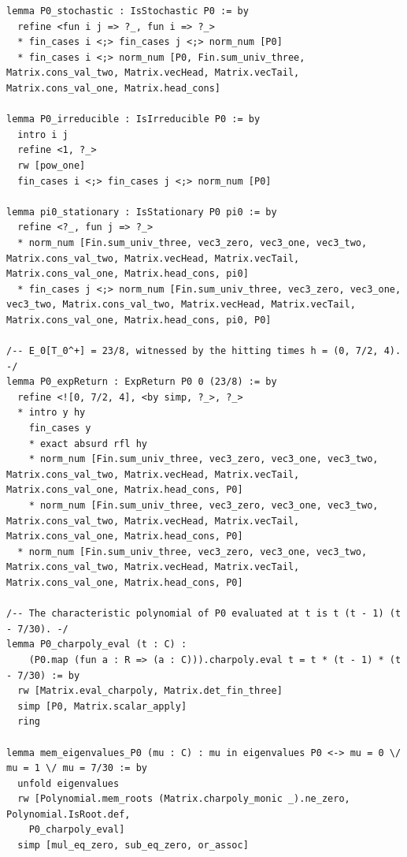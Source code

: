 \documentclass[11pt,a4paper]{article}
\begin{document}
\begin{lstlisting}[language={}]
lemma P0_stochastic : IsStochastic P0 := by
  refine <fun i j => ?_, fun i => ?_>
  * fin_cases i <;> fin_cases j <;> norm_num [P0]
  * fin_cases i <;> norm_num [P0, Fin.sum_univ_three, Matrix.cons_val_two, Matrix.vecHead, Matrix.vecTail, Matrix.cons_val_one, Matrix.head_cons]

lemma P0_irreducible : IsIrreducible P0 := by
  intro i j
  refine <1, ?_>
  rw [pow_one]
  fin_cases i <;> fin_cases j <;> norm_num [P0]

lemma pi0_stationary : IsStationary P0 pi0 := by
  refine <?_, fun j => ?_>
  * norm_num [Fin.sum_univ_three, vec3_zero, vec3_one, vec3_two, Matrix.cons_val_two, Matrix.vecHead, Matrix.vecTail, Matrix.cons_val_one, Matrix.head_cons, pi0]
  * fin_cases j <;> norm_num [Fin.sum_univ_three, vec3_zero, vec3_one, vec3_two, Matrix.cons_val_two, Matrix.vecHead, Matrix.vecTail, Matrix.cons_val_one, Matrix.head_cons, pi0, P0]

/-- E_0[T_0^+] = 23/8, witnessed by the hitting times h = (0, 7/2, 4). -/
lemma P0_expReturn : ExpReturn P0 0 (23/8) := by
  refine <![0, 7/2, 4], <by simp, ?_>, ?_>
  * intro y hy
    fin_cases y
    * exact absurd rfl hy
    * norm_num [Fin.sum_univ_three, vec3_zero, vec3_one, vec3_two, Matrix.cons_val_two, Matrix.vecHead, Matrix.vecTail, Matrix.cons_val_one, Matrix.head_cons, P0]
    * norm_num [Fin.sum_univ_three, vec3_zero, vec3_one, vec3_two, Matrix.cons_val_two, Matrix.vecHead, Matrix.vecTail, Matrix.cons_val_one, Matrix.head_cons, P0]
  * norm_num [Fin.sum_univ_three, vec3_zero, vec3_one, vec3_two, Matrix.cons_val_two, Matrix.vecHead, Matrix.vecTail, Matrix.cons_val_one, Matrix.head_cons, P0]

/-- The characteristic polynomial of P0 evaluated at t is t (t - 1) (t - 7/30). -/
lemma P0_charpoly_eval (t : C) :
    (P0.map (fun a : R => (a : C))).charpoly.eval t = t * (t - 1) * (t - 7/30) := by
  rw [Matrix.eval_charpoly, Matrix.det_fin_three]
  simp [P0, Matrix.scalar_apply]
  ring

lemma mem_eigenvalues_P0 (mu : C) : mu in eigenvalues P0 <-> mu = 0 \/ mu = 1 \/ mu = 7/30 := by
  unfold eigenvalues
  rw [Polynomial.mem_roots (Matrix.charpoly_monic _).ne_zero, Polynomial.IsRoot.def,
    P0_charpoly_eval]
  simp [mul_eq_zero, sub_eq_zero, or_assoc]


\end{lstlisting}
\end{document}
